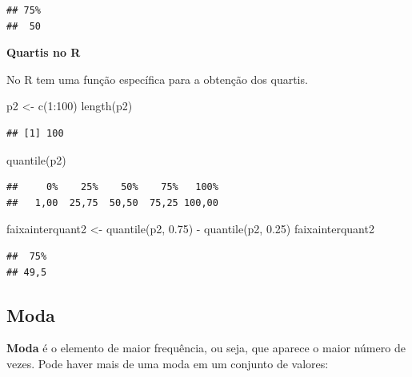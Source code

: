 \documentclass[
]{book}
\newenvironment{Shaded}{\begin{snugshade}}{\end{snugshade}}
\newcommand{\DecValTok}[1]{\textcolor[rgb]{0.00,0.00,0.81}{#1}}
\newcommand{\FloatTok}[1]{\textcolor[rgb]{0.00,0.00,0.81}{#1}}
\newcommand{\FunctionTok}[1]{\textcolor[rgb]{0.00,0.00,0.00}{#1}}
\newcommand{\NormalTok}[1]{#1}
\newcommand{\OtherTok}[1]{\textcolor[rgb]{0.56,0.35,0.01}{#1}}
\newcommand{\SpecialCharTok}[1]{\textcolor[rgb]{0.00,0.00,0.00}{#1}}
\begin{document}
\begin{verbatim}
## 75% 
##  50
\end{verbatim}

\textbf{Quartis no R}

No R tem uma função específica para a obtenção dos quartis.

\begin{Shaded}
\begin{Highlighting}[]
\NormalTok{p2 }\OtherTok{\textless{}{-}} \FunctionTok{c}\NormalTok{(}\DecValTok{1}\SpecialCharTok{:}\DecValTok{100}\NormalTok{)}
\FunctionTok{length}\NormalTok{(p2)}
\end{Highlighting}
\end{Shaded}

\begin{verbatim}
## [1] 100
\end{verbatim}

\begin{Shaded}
\begin{Highlighting}[]
\FunctionTok{quantile}\NormalTok{(p2)}
\end{Highlighting}
\end{Shaded}

\begin{verbatim}
##     0%    25%    50%    75%   100% 
##   1,00  25,75  50,50  75,25 100,00
\end{verbatim}

\begin{Shaded}
\begin{Highlighting}[]
\NormalTok{faixainterquant2 }\OtherTok{\textless{}{-}} \FunctionTok{quantile}\NormalTok{(p2, }\FloatTok{0.75}\NormalTok{) }\SpecialCharTok{{-}} \FunctionTok{quantile}\NormalTok{(p2, }
    \FloatTok{0.25}\NormalTok{)}
\NormalTok{faixainterquant2}
\end{Highlighting}
\end{Shaded}

\begin{verbatim}
##  75% 
## 49,5
\end{verbatim}

\hypertarget{moda}{%
\subsection{Moda}\label{moda}}

\textbf{Moda} é o elemento de maior frequência, ou seja, que aparece o maior número de vezes. Pode haver mais de uma moda em um conjunto de valores:
\end{document}
